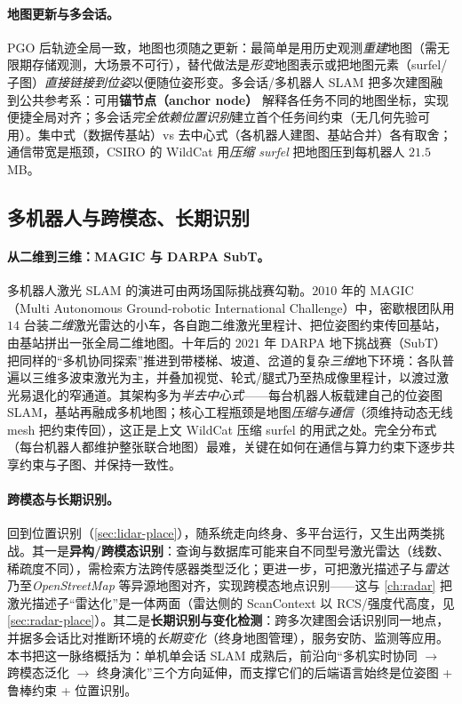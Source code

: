 \paragraph{地图更新与多会话。}
PGO 后轨迹全局一致，地图也须随之更新\cite{carlone2026handbook}：最简单是用历史观测\emph{重建}地图（需无限期存储观测，大场景不可行），替代做法是\emph{形变}地图表示或把地图元素（surfel/子图）\emph{直接链接到位姿}以便随位姿形变。多会话/多机器人 SLAM 把多次建图融到公共参考系：可用\textbf{锚节点（anchor node）}\cite{kim2010multiple} 解释各任务不同的地图坐标，实现便捷全局对齐；多会话\emph{完全依赖位置识别}建立首个任务间约束（无几何先验可用）。集中式（数据传基站）vs 去中心式（各机器人建图、基站合并）各有取舍；通信带宽是瓶颈，CSIRO 的 WildCat 用\emph{压缩 surfel} 把地图压到每机器人 $21.5$\,MB。

\subsection{多机器人与跨模态、长期识别}
\label{sec:lidar-multirobot}

\paragraph{从二维到三维：MAGIC 与 DARPA SubT。}
多机器人激光 SLAM 的演进可由两场国际挑战赛勾勒\cite{carlone2026handbook}。$2010$ 年的 MAGIC（Multi Autonomous Ground-robotic International Challenge）中，密歇根团队用 $14$ 台装\emph{二维}激光雷达的小车，各自跑二维激光里程计、把位姿图约束传回基站，由基站拼出一张全局二维地图\cite{olson2012magic}。十年后的 $2021$ 年 DARPA 地下挑战赛（SubT）把同样的“多机协同探索”推进到带楼梯、坡道、岔道的复杂\emph{三维}地下环境：各队普遍以三维多波束激光为主，并叠加视觉、轮式/腿式乃至热成像里程计，以渡过激光易退化的窄通道\cite{tranzatto2022cerberus,ebadi2022present}。其架构多为\emph{半去中心式}——每台机器人板载建自己的位姿图 SLAM，基站再融成多机地图；核心工程瓶颈是地图\emph{压缩与通信}（须维持动态无线 mesh 把约束传回），这正是上文 WildCat 压缩 surfel 的用武之处。完全分布式（每台机器人都维护整张联合地图）最难，关键在如何在通信与算力约束下逐步共享约束与子图、并保持一致性\cite{carlone2026handbook}。

\paragraph{跨模态与长期识别。}
回到位置识别（\cref{sec:lidar-place}），随系统走向终身、多平台运行，又生出两类挑战\cite{carlone2026handbook}。其一是\textbf{异构/跨模态识别}：查询与数据库可能来自不同型号激光雷达（线数、稀疏度不同），需检索方法跨传感器类型泛化；更进一步，可把激光描述子与\emph{雷达}\cite{cattaneo2022lcdnet} 乃至\emph{OpenStreetMap}\cite{cho2022osmloc} 等异源地图对齐，实现跨模态地点识别——这与 \cref{ch:radar} 把激光描述子“雷达化”是一体两面（雷达侧的 ScanContext 以 RCS/强度代高度，见 \cref{sec:radar-place}）。其二是\textbf{长期识别与变化检测}：跨多次建图会话识别同一地点，并据多会话比对推断环境的\emph{长期变化}（终身地图管理），服务安防、监测等应用。本书把这一脉络概括为：单机单会话 SLAM 成熟后，前沿向“多机实时协同 $\to$ 跨模态泛化 $\to$ 终身演化”三个方向延伸，而支撑它们的后端语言始终是位姿图 + 鲁棒约束 + 位置识别。

